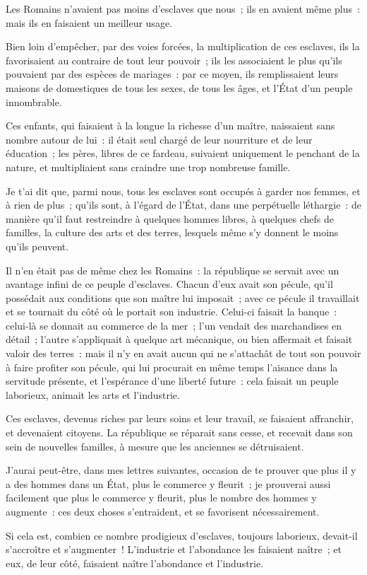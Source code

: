 \documentclass[french,twoside]{book} %
\begin{document}
\noindent Les Romains n’avaient pas moins d’esclaves que nous ; ils en avaient même plus : mais ils en faisaient un meilleur usage.\par
Bien loin d’empêcher, par des voies forcées, la multiplication de ces esclaves, ils la favorisaient au contraire de tout leur pouvoir ; ils les associaient le plus qu’ils pouvaient par des espèces de mariages : par ce moyen, ils remplissaient leurs maisons de domestiques de tous les sexes, de tous les âges, et l’État d’un peuple innombrable.\par
Ces enfants, qui faisaient à la longue la richesse d’un maître, naissaient sans nombre autour de lui : il était seul chargé de leur nourriture et de leur éducation ; les pères, libres de ce fardeau, suivaient uniquement le penchant de la nature, et multipliaient sans craindre une trop nombreuse famille.\par
Je t’ai dit que, parmi nous, tous les esclaves sont occupés à garder nos femmes, et à rien de plus ; qu’ils sont, à l’égard de l’État, dans une perpétuelle léthargie : de manière qu’il faut restreindre à quelques hommes libres, à quelques chefs de familles, la culture des arts et des terres, lesquels même s’y donnent le moins qu’ils peuvent.\par
Il n’en était pas de même chez les Romains : la république se servait avec un avantage infini de ce peuple d’esclaves. Chacun d’eux avait son pécule, qu’il possédait aux conditions que son maître lui imposait ; avec ce pécule il travaillait et se tournait du côté où le portait son industrie. Celui-ci faisait la banque : celui-là se donnait au commerce de la mer ; l’un vendait des marchandises en détail ; l’autre s’appliquait à quelque art mécanique, ou bien affermait et faisait valoir des terres : mais il n’y en avait aucun qui ne s’attachât de tout son pouvoir à faire profiter son pécule, qui lui procurait en même temps l’aisance dans la servitude présente, et l’espérance d’une liberté future : cela faisait un peuple laborieux, animait les arts et l’industrie.\par
Ces esclaves, devenus riches par leurs soins et leur travail, se faisaient affranchir, et devenaient citoyens. La république se réparait sans cesse, et recevait dans son sein de nouvelles familles, à mesure que les anciennes se détruisaient.\par
J’aurai peut-être, dans mes lettres suivantes, occasion de te prouver que plus il y a des hommes dans un État, plus le commerce y fleurit ; je prouverai aussi facilement que plus le commerce y fleurit, plus le nombre des hommes y augmente : ces deux choses s’entraident, et se favorisent nécessairement.\par
Si cela est, combien ce nombre prodigieux d’esclaves, toujours laborieux, devait-il s’accroître et s’augmenter ! L’industrie et l’abondance les faisaient naître ; et eux, de leur côté, faisaient naître l’abondance et l’industrie.\par
\end{document}
